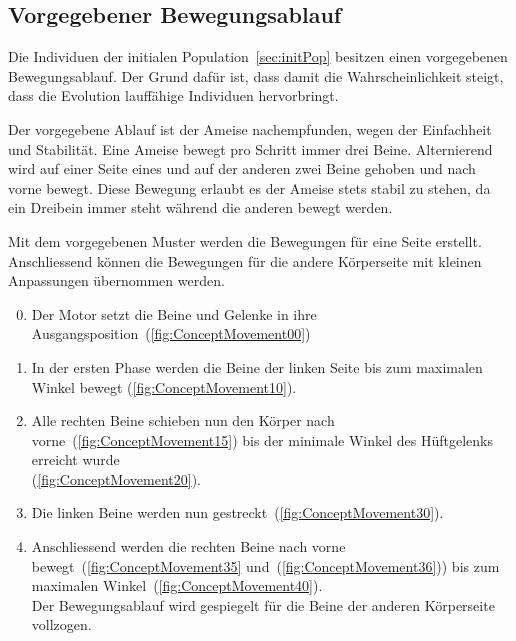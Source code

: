     \subsection{Vorgegebener Bewegungsablauf}

      Die Individuen der initialen Population~\vref{sec:initPop} besitzen einen vorgegebenen Bewegungsablauf.
      Der Grund dafür ist, dass damit die Wahrscheinlichkeit steigt,
      dass die Evolution lauffähige Individuen hervorbringt.

      \medskip

      Der vorgegebene Ablauf ist der Ameise nachempfunden, wegen der Einfachheit und Stabilität.
      Eine Ameise bewegt pro Schritt immer drei Beine.
      Alternierend wird auf einer Seite eines und auf der anderen zwei Beine gehoben und nach vorne bewegt.
      Diese Bewegung erlaubt es der Ameise stets stabil zu stehen,
      da ein Dreibein immer steht während die anderen bewegt werden.

      \medskip

      Mit dem vorgegebenen Muster werden die Bewegungen für eine Seite erstellt.
      Anschliessend können die Bewegungen für die andere Körperseite mit kleinen Anpassungen übernommen werden.

      \begin{enumerate}

        \setcounter{enumi}{-1}

        \item Der Motor setzt die Beine und Gelenke in ihre Ausgangsposition~(\vref{fig:ConceptMovement00})

        \item In der ersten Phase werden die Beine der linken Seite bis zum maximalen Winkel bewegt
          (\vref{fig:ConceptMovement10}).

        \item Alle rechten Beine schieben nun den Körper nach vorne~(\vref{fig:ConceptMovement15}) bis der minimale
          Winkel des Hüftgelenks erreicht wurde
          \\
          (\vref{fig:ConceptMovement20}).

        \item Die linken Beine werden nun gestreckt~(\vref{fig:ConceptMovement30}).

        \item Anschliessend werden die rechten Beine nach vorne bewegt~(\vref{fig:ConceptMovement35}
          und~(\vref{fig:ConceptMovement36})) bis zum maximalen Winkel~(\vref{fig:ConceptMovement40}).
          \\
          Der Bewegungsablauf wird gespiegelt für die Beine der anderen Körperseite vollzogen.

      \end{enumerate}


